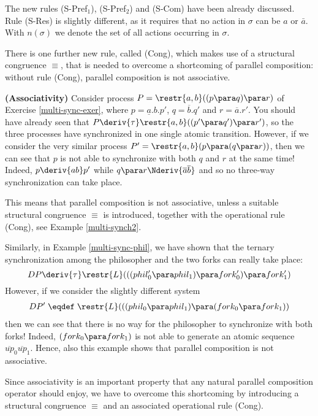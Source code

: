 The new rules (S-Pref$_1$), (S-Pref$_2$) and (S-Com) have been already discussed.
Rule (S-Res) is slightly different, as it requires that no action in $\sigma$ can be $a$ or $\bar{a}$.
With $n(\sigma)$ we denote the set of all actions occurring in $\sigma$.

There is one further new rule, called  (Cong), which makes use of a structural congruence $\equiv$,
that is needed to overcome a shortcoming of parallel composition: without rule (Cong), parallel
composition is not associative.

\begin{example}\label{no-assoc}{\bf (Associativity)}
Consider process $P = \restr{a,b}((p \para q) \para r)$ of Exercise \ref{multi-sync-exer},
where $p = \underline{a}.b.p'$, $q = \overline{b}.q'$ and $r = \overline{a}.r'$. You should have already
seen that  $P \deriv{\tau} \restr{a,b}((p' \para q') \para r')$, so the three processes 
have synchronized in one single atomic transition. However, if we consider the very similar
process $P' = \restr{a,b}(p \para (q \para r))$, then we can see that $p$ is not able to synchronize
with both $q$ and $r$ at the same time! Indeed, $p \deriv{ab}p'$ while $q \para r \Nderiv{\overline{a}\overline{b}}$
and so no three-way synchronization can take place.

This means that parallel composition is not associative, unless a suitable structural congruence $\equiv$ 
is introduced, together with the operational rule (Cong), see Example \ref{multi-synch2}.

Similarly, in Example \ref{multi-sync-phil}, we have shown that the ternary synchronization among
the philosopher and the two forks can really take place:
\[
DP \deriv{\tau}  \restr{L}(((phil'_0\para phil_1) \para fork'_0) \para fork'_1) 
\]
However, if we consider the slightly different system 
\begin{eqnarray*}
DP' \;  \eqdef \;  \restr{L}(((phil_0\para phil_1) \para (fork_0 \para fork_1))
\end{eqnarray*}
then we can see that there is no way for the philosopher to synchronize with both forks! 
Indeed, $(fork_0 \para fork_1)$ is not able to generate an atomic sequence $\overline{up}_0 \overline{up}_1$.
Hence, also this example shows that parallel composition is not associative.
\fine
\end{example}

Since associativity is an important property that
any natural parallel composition operator should enjoy, we have to overcome this shortcoming by introducing
a structural congruence $\equiv$  and an associated operational rule (Cong).

